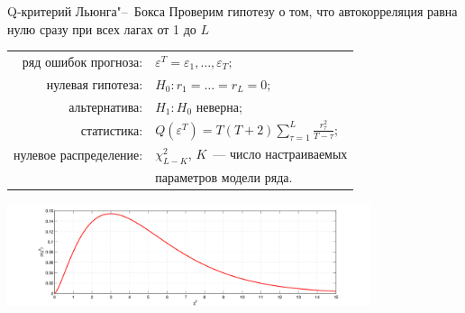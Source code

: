 \documentclass[10pt,pdf,utf8,hyperref={unicode},aspectratio=169]{beamer}
\begin{document}
    
\begin{frame}{Q-критерий Льюнга"--~Бокса}{}
	Проверим гипотезу о том, что автокорреляция равна нулю сразу при всех лагах от 1 до $L$
	\begin{center}
		\begin{tabular}{rl}
			ряд ошибок прогноза:            & $\varepsilon^T = \varepsilon_1,\dots,\varepsilon_T;$ \\
			нулевая гипотеза:               & $H_0\colon r_1 = \dots = r_L=0;$ \\
			альтернатива:                   & $H_1\colon H_0$ неверна;\\
			статистика:                     & $Q\left(\varepsilon^T\right) = T\left(T+2\right) \sum\limits_{\tau=1}^L \frac{r_{\tau}^2}{T-\tau};$ \\
			нулевое распределение:          & $\chi^2_{L-K}$, $K$~--- число настраиваемых\\
			& параметров модели ряда.
		\end{tabular}
		\includegraphics[width=0.8\textwidth]{chi2.png}
	\end{center}
\end{frame}
    
\end{document}
